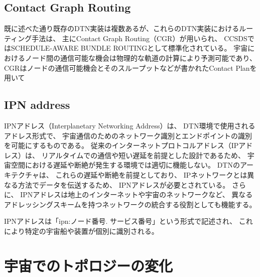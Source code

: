 \subsection{Contact Graph Routing}
既に述べた通り既存のDTN実装は複数あるが、これらのDTN実装におけるルーティング手法は、
主にContact Graph Routing（CGR）が用いられ、 
CCSDSではSCHEDULE-AWARE BUNDLE ROUTINGとして標準化されている。 
宇宙におけるノード間の通信可能な機会は物理的な軌道の計算により予測可能であり、 
CGRはノードの通信可能機会とそのスループットなどが書かれたContact Planを用いて
\subsection{IPN address}
IPNアドレス（Interplanetary Networking Address）は、 DTN環境で使用されるアドレス形式で、
宇宙通信のためのネットワーク識別とエンドポイントの識別を可能にするものである。 従来のインターネットプロトコルアドレス（IPアドレス）は、
リアルタイムでの通信や短い遅延を前提とした設計であるため、 宇宙空間における遅延や断絶が発生する環境では適切に機能しない。
DTNのアーキテクチャは、 これらの遅延や断絶を前提としており、 IPネットワークとは異なる方法でデータを伝送するため、
IPNアドレスが必要とされている。 さらに、 IPNアドレスは地上のインターネットや宇宙のネットワークなど、
異なるアドレッシングスキームを持つネットワークの統合する役割としても機能する。

IPNアドレスは「ipn:ノード番号. サービス番号」という形式で記述され、 これにより特定の宇宙船や装置が個別に識別される。 

\section{宇宙でのトポロジーの変化}